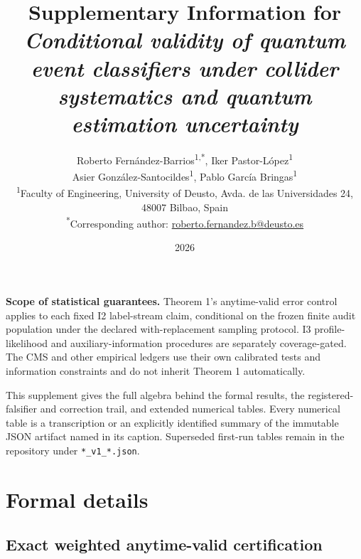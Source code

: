 \documentclass[11pt,a4paper]{article}
\title{Supplementary Information for\\
\emph{Conditional validity of quantum event classifiers under collider
systematics and quantum estimation uncertainty}}
\author{Roberto Fern\'andez-Barrios\textsuperscript{1,*},
Iker Pastor-L\'opez\textsuperscript{1}\\
Asier Gonz\'alez-Santocildes\textsuperscript{1},
Pablo Garc\'ia Bringas\textsuperscript{1}\\[0.6em]
\small\textsuperscript{1}Faculty of Engineering, University of Deusto,
Avda. de las Universidades 24, 48007 Bilbao, Spain\\
\small\textsuperscript{*}Corresponding author:
\href{mailto:roberto.fernandez.b@deusto.es}{roberto.fernandez.b@deusto.es}}
\date{2026}
\begin{document}
\maketitle

\noindent\textbf{Scope of statistical guarantees.} Theorem 1's anytime-valid
error control applies to each fixed I2 label-stream claim, conditional on the
frozen finite audit population under the declared with-replacement sampling
protocol. I3 profile-likelihood and auxiliary-information procedures are
separately coverage-gated. The CMS and other empirical ledgers use their own
calibrated tests and information constraints and do not inherit Theorem 1
automatically.

This supplement gives the full algebra behind the formal results, the
registered-falsifier and correction trail, and extended numerical tables.
Every numerical table is a transcription or an explicitly identified
summary of the immutable JSON artifact named in its caption. Superseded
first-run tables remain in the repository under \texttt{*\_v1\_*.json}.

\section{Formal details}

\subsection{Exact weighted anytime-valid certification}
\label{supp:weighted}
\end{document}
